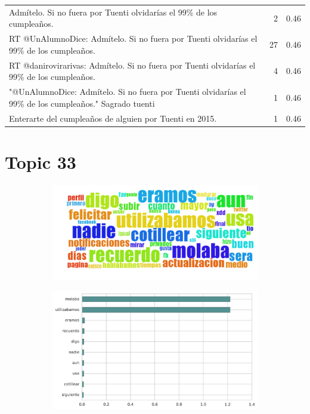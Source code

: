 \begin{longtable}{p{12.5cm}rr}
Admítelo. Si no fuera por Tuenti olvidarías el 99\% de los cumpleaños. & 2 & 0.46 \\
RT @UnAlumnoDice: Admítelo. Si no fuera por Tuenti olvidarías el 99\% de los cumpleaños. & 27 & 0.46 \\
RT @danirovirarivas: Admítelo. Si no fuera por Tuenti olvidarías el 99\% de los cumpleaños. & 4 & 0.46 \\
"@UnAlumnoDice: Admítelo. Si no fuera por Tuenti olvidarías el 99\% de los cumpleaños." Sagrado tuenti & 1 & 0.46 \\
Enterarte del cumpleaños de alguien por Tuenti en 2015. & 1 & 0.46 \\

\end{longtable}
\clearpage

\section{Topic 33}

\begin{figure}[htbp!]
    \centering
    \begin{subfigure}[b]{0.49\textwidth}
        \includegraphics[width=\textwidth]{twitter_all/report_images/topic-33-wordcloud.jpg}
    \end{subfigure}
    \begin{subfigure}[b]{0.49\textwidth}
        \includegraphics[width=\textwidth]{twitter_all/report_images/topic-33-terms.jpg}
    \end{subfigure}
\end{figure}

